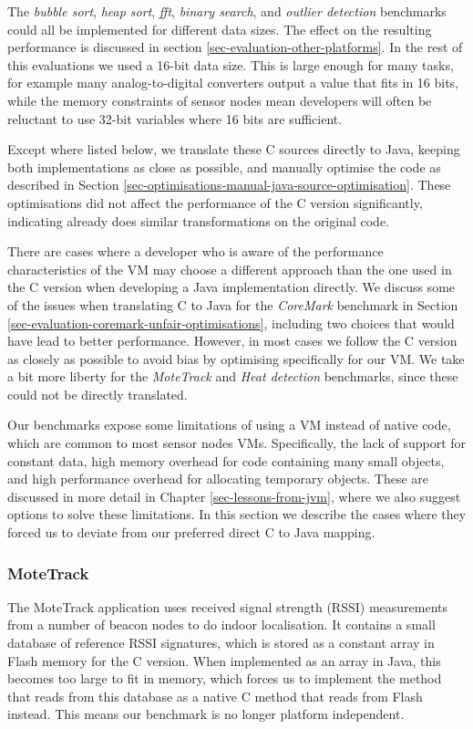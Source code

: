 The \emph{bubble sort}, \emph{heap sort}, \emph{fft}, \emph{binary search}, and \emph{outlier detection} benchmarks could all be implemented for different data sizes. The effect on the resulting performance is discussed in section \ref{sec-evaluation-other-platforms}. In the rest of this evaluations we used a 16-bit data size. This is large enough for many tasks, for example many analog-to-digital converters output a value that fits in 16 bits, while the memory constraints of sensor nodes mean developers will often be reluctant to use 32-bit variables where 16 bits are sufficient.

Except where listed below, we translate these C sources directly to Java, keeping both implementations as close as possible, and manually optimise the code as described in Section \ref{sec-optimisations-manual-java-source-optimisation}. These optimisations did not affect the performance of the C version significantly, indicating  already does similar transformations on the original code.

There are cases where a developer who is aware of the performance characteristics of the VM may choose a different approach than the one used in the C version when developing a Java implementation directly. We discuss some of the issues when translating C to Java for the \emph{CoreMark} benchmark in Section \ref{sec-evaluation-coremark-unfair-optimisations}, including two choices that would have lead to better performance. However, in most cases we follow the C version as closely as possible to avoid bias by optimising specifically for our VM. We take a bit more liberty for the \emph{MoteTrack} and \emph{Heat detection} benchmarks, since these could not be directly translated.

Our benchmarks expose some limitations of using a VM instead of native code, which are common to most sensor nodes VMs. Specifically, the lack of support for constant data, high memory overhead for code containing many small objects, and high performance overhead for allocating temporary objects. These are discussed in more detail in Chapter \ref{sec-lessons-from-jvm}, where we also suggest options to solve these limitations. In this section we describe the cases where they forced us to deviate from our preferred direct C to Java mapping.


\subsubsection{MoteTrack}
\label{sec-evaluation-benchmark-implementation-motetrack}
The MoteTrack application uses received signal strength (RSSI) measurements from a number of beacon nodes to do indoor localisation. It contains a small database of reference RSSI signatures, which is stored as a constant array in Flash memory for the C version. When implemented as an array in Java, this becomes too large to fit in memory, which forces us to implement the method that reads from this database as a native C method that reads from Flash instead. This means our benchmark is no longer platform independent.

